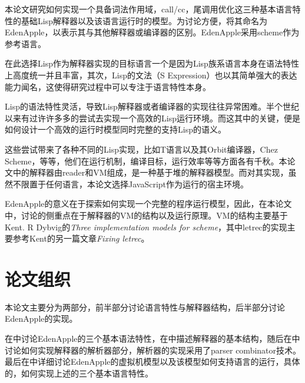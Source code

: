 本论文研究如何实现一个具备词法作用域，call/cc，尾调用优化这三种基本语言特性的基础Lisp解释器以及该语言运行时的模型。为讨论方便，将其命名为EdenApple，以表示其与其他解释器或编译器的区别。EdenApple采用scheme作为参考语言。

在此选择Lisp作为解释器实现的目标语言一个是因为Lisp族系语言本身在语法特性上高度统一并且丰富，其次，Lisp的文法（S Expression）也以其简单强大的表达能力闻名，这使得研究过程中可以专注于语言特性本身。

Lisp的语法特性灵活，导致Lisp解释器或者编译器的实现往往异常困难。半个世纪以来有过许许多多的尝试去实现一个高效的Lisp运行环境。而这其中的关键，便是如何设计一个高效的运行时模型同时完整的支持Lisp的语义。

这些尝试带来了各种不同的Lisp实现，比如T语言以及其Orbit编译器\cite{Adams1986ORBIT}，Chez Scheme\cite{dybvig2006chez}，等等，他们在运行机制，编译目标，运行效率等等方面各有千秋。本论文中的解释器由reader和VM组成，是一种基于堆的解释器模型。而对其实现，虽然不限置于任何语言，本论文选择JavaScript作为运行的宿主环境。

EdenApple的意义在于探索如何实现一个完整的程序运行模型，因此，在本论文中，讨论的侧重点在于解释器的VM的结构以及运行原理。VM的结构主要基于Kent. R Dybvig的\textit{Three implementation models for scheme\cite{dybvig87timpl}}，其中letrec的实现主要参考Kent的另一篇文章\textit{Fixing letrec\cite{Waddell2005Dybvig}}。

\section*{论文组织}

本论文主要分为两部分，前半部分讨论语言特性与解释器结构，后半部分讨论EdenApple的实现。

在中讨论EdenApple的三个基本语法特性，在中描述解释器的基本结构，随后在中讨论如何实现解释器的解析器部分，解析器的实现采用了parser combinator技术。最后在中详细讨论EdenApple的虚拟机模型以及该模型如何支持语言的运行，具体的，如何实现上述的三个基本语言特性。